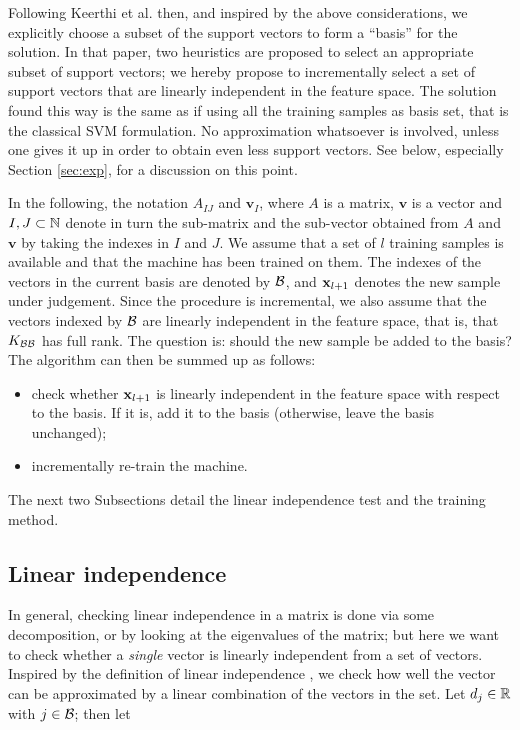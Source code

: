 Following Keerthi et al. \cite{KeerthiCDC06} then, and inspired by the
above considerations, we explicitly choose a subset of the support
vectors to form a ``basis'' for the solution. In that paper, two
heuristics are proposed to select an appropriate subset of support
vectors; we hereby propose to incrementally select a set of support
vectors that are linearly independent in the feature space. The
solution found this way is the same as if using all the training
samples as basis set, that is the classical SVM formulation. No
approximation whatsoever is involved, unless one gives it up in order
to obtain even less support vectors. See below, especially Section
\ref{sec:exp}, for a discussion on this point.

In the following, the notation $A_{IJ}$ and $\mathbf{v}_I$, where $A$
is a matrix, $\mathbf{v}$ is a vector and $I,J \subset \mathbb{N}$ denote in
turn the sub-matrix and the sub-vector obtained from $A$ and
$\mathbf{v}$ by taking the indexes in $I$ and $J$. We assume that a
set of $l$ training samples is available and that the machine has been
trained on them. The indexes of the vectors in the current basis are
denoted by $\mathcal{B}$, and $\mathbf{x}_{l+1}$ denotes the new sample under
judgement. Since the procedure is incremental, we also assume that the
vectors indexed by $\mathcal{B}$ are linearly independent in the feature space,
that is, that $K_{\mathcal{B}\mathcal{B}}$ has full rank. The question is: should the
new sample be added to the basis? The algorithm can then be summed up
as follows:

\begin{itemize}

  \item check whether $\mathbf{x}_{l+1}$ is linearly independent in the
        feature space with respect to the basis. If it is, add it to
        the basis (otherwise, leave the basis unchanged);

  \item incrementally re-train the machine.

\end{itemize}

The next two Subsections detail the linear independence test and the
training method.

\subsection{Linear independence}

In general, checking linear independence in a matrix is done via some
decomposition, or by looking at the eigenvalues of the matrix; but
here we want to check whether a \emph{single} vector is linearly
independent from a set of vectors. Inspired by the definition of
linear independence \cite{EngelMM02sparse}, we check how well the
vector can be approximated by a linear combination of the vectors in
the set. Let $d_j \in \mathbb{R}$ with $j \in \mathcal{B}$; then let

